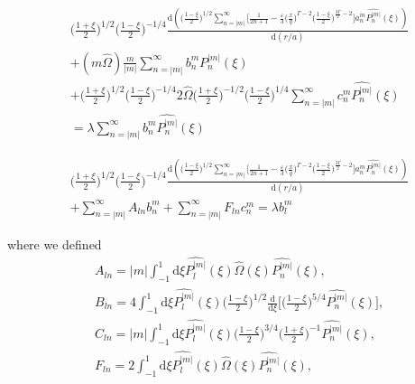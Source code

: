 \documentclass[11pt]{article}
\newcommand{\rd}{\mathrm{d}}
\newcommand{\anm}{a_n^m}
\newcommand{\bnm}{b_n^m}
\newcommand{\cnm}{c_n^m}
\newcommand{\blm}{b_l^m}
\newcommand{\Pnm}{P_n^{|m|}}
\newcommand{\Plm}{P_l^{|m|}}
\newcommand{\hPnm}{\widehat{\Pnm}}
\newcommand{\hPlm}{\widehat{\Plm}}
\newcommand{\hOmega}{\widehat{\Omega}}
\begin{document}
\begin{align*}
&\bigg(\frac{1+\xi}{2}\bigg)^{1/2} \bigg(\frac{1-\xi}{2}\bigg)^{-1/4} \frac{\rd ( \bigg(\frac{1-\xi}{2}\bigg)^{1/2}\sum_{n=|m|}^{\infty} \bigg[\frac{1}{2n+1}-\frac{\varepsilon}{3}  \bigg(\frac{x}{q}\bigg)^{\Gamma-2} \bigg(\frac{1-\xi}{2}\bigg)^{\frac{3\Gamma}{2}-2}    \bigg]\anm \hPnm(\xi))}{\rd (r/a)} \\
&+( m \hOmega) \frac{m}{|m|} \sum_{n=|m|}^{\infty} \bnm \hPnm(\xi)  \\
&+\bigg(\frac{1+\xi}{2}\bigg)^{1/2} \bigg(\frac{1-\xi}{2}\bigg)^{-1/4}  2 \hOmega \bigg(\frac{1+\xi}{2}\bigg)^{-1/2} \bigg(\frac{1-\xi}{2}\bigg)^{1/4} \sum_{n=|m|}^{\infty} \cnm \hPnm(\xi) \\
&= \lambda  \sum_{n=|m|}^{\infty} \bnm \hPnm(\xi) 
\end{align*}


\begin{align*}
&\bigg(\frac{1+\xi}{2}\bigg)^{1/2} \bigg(\frac{1-\xi}{2}\bigg)^{-1/4} \frac{\rd ( \bigg(\frac{1-\xi}{2}\bigg)^{1/2}\sum_{n=|m|}^{\infty} \bigg[\frac{1}{2n+1}-\frac{\varepsilon}{3}  \bigg(\frac{x}{q}\bigg)^{\Gamma-2} \bigg(\frac{1-\xi}{2}\bigg)^{\frac{3\Gamma}{2}-2}    \bigg]\anm \hPnm(\xi))}{\rd (r/a)} \\
&+ \sum_{n=|m|}^{\infty}   A_{ln} \bnm+  \sum_{n=|m|}^{\infty} F_{ln} \cnm  = \lambda   \blm 
\end{align*}


where we defined
\begin{align*}
&A_{ln} = |m| \int_{-1}^{1} \rd \xi  \hPlm(\xi)\hOmega(\xi)\hPnm(\xi) , \\
&B_{ln} = 4 \int_{-1}^{1} \rd \xi  \hPlm(\xi) \bigg(\frac{1-\xi}{2}\bigg)^{1/2} \frac{\rd}{\rd \xi} \bigg[\bigg(\frac{1-\xi}{2}\bigg)^{5/4}\hPnm(\xi)\bigg], \\
&C_{ln} = |m| \int_{-1}^{1} \rd \xi \hPlm(\xi) \bigg(\frac{1-\xi}{2}\bigg)^{3/4}\bigg(\frac{1+\xi}{2}\bigg)^{-1}   \hPnm(\xi), \\
&F_{ln} =2 \int_{-1}^{1} \rd \xi  \hPlm(\xi)\hOmega(\xi)\hPnm(\xi) , \\
\end{align*}
\end{document}
